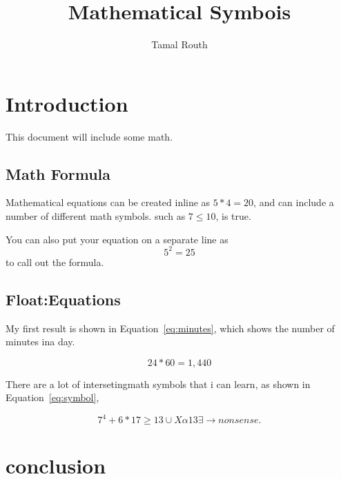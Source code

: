 \documentclass[a4paper,10pt]{article}
\title{Mathematical Symbois}
\author{Tamal Routh}
\date{}
\begin{document}
\maketitle

\section{Introduction}

This document will include some math.

\subsection{Math Formula}

Mathematical equations can be created inline as $5*4=20$, and can include a number of different math symbols. such as $7\leq 10$, is true.

You can also put your equation on a separate line as \[5^2=25\] to call out the formula.

\subsection{Float:Equations}

My first result is shown in Equation~\ref{eq:minutes}, which shows the number of minutes ina day.

\begin{equation}
24*60=1,440
\label{eq:minutes}
\end{equation}

There are a lot of intersetingmath symbols that i can learn, as shown in Equation~\ref{eq:symbol},

\begin{equation}
 7^4+6*17\geq 13\cup X\alpha 13\exists \rightarrow nonsense.
\label{eq:symbols}
\end{equation}

\section{conclusion}
\end{document}
